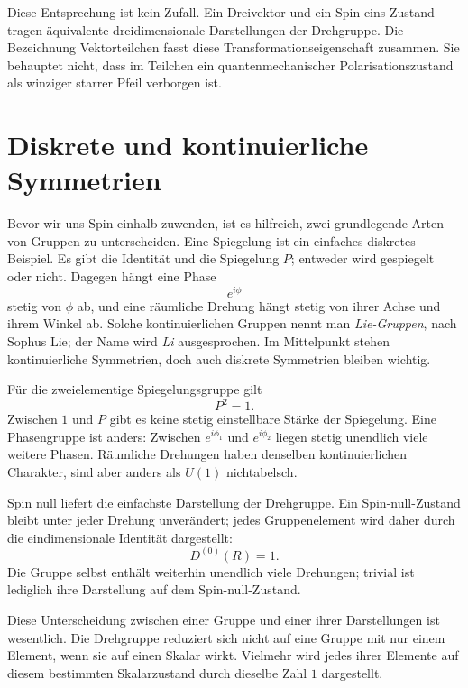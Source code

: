 Diese Entsprechung ist kein Zufall. Ein Dreivektor und ein Spin-eins-Zustand tragen äquivalente dreidimensionale Darstellungen der Drehgruppe. Die Bezeichnung {Vektorteilchen} fasst diese Transformationseigenschaft zusammen. Sie behauptet nicht, dass im Teilchen ein quantenmechanischer Polarisationszustand als winziger starrer Pfeil verborgen ist.

\section{Diskrete und kontinuierliche Symmetrien}

Bevor wir uns Spin einhalb zuwenden, ist es hilfreich, zwei grundlegende Arten von Gruppen zu unterscheiden. Eine Spiegelung ist ein einfaches diskretes Beispiel. Es gibt die Identität und die Spiegelung \(P\); entweder wird gespiegelt oder nicht. Dagegen hängt eine Phase
\begin{equation}
e^{i\phi}
\end{equation}
stetig von \(\phi\) ab, und eine räumliche Drehung hängt stetig von ihrer Achse und ihrem Winkel ab. Solche kontinuierlichen Gruppen nennt man \emph{Lie-Gruppen}, nach Sophus Lie; der Name wird \emph{Li} ausgesprochen. Im Mittelpunkt stehen kontinuierliche Symmetrien, doch auch diskrete Symmetrien bleiben wichtig.

Für die zweielementige Spiegelungsgruppe gilt
\begin{equation}
P^2=1.
\end{equation}
Zwischen \(1\) und \(P\) gibt es keine stetig einstellbare Stärke der Spiegelung. Eine Phasengruppe ist anders: Zwischen \(e^{i\phi_1}\) und \(e^{i\phi_2}\) liegen stetig unendlich viele weitere Phasen. Räumliche Drehungen haben denselben kontinuierlichen Charakter, sind aber anders als \(U(1)\) nichtabelsch.

Spin null liefert die einfachste Darstellung der Drehgruppe. Ein Spin-null-Zustand bleibt unter jeder Drehung unverändert; jedes Gruppenelement wird daher durch die eindimensionale Identität dargestellt:
\begin{equation}
D^{(0)}(R)=1.
\end{equation}
Die Gruppe selbst enthält weiterhin unendlich viele Drehungen; trivial ist lediglich ihre Darstellung auf dem Spin-null-Zustand.

Diese Unterscheidung zwischen einer Gruppe und einer ihrer Darstellungen ist wesentlich. Die Drehgruppe reduziert sich nicht auf eine Gruppe mit nur einem Element, wenn sie auf einen Skalar wirkt. Vielmehr wird jedes ihrer Elemente auf diesem bestimmten Skalarzustand durch dieselbe Zahl \(1\) dargestellt.

